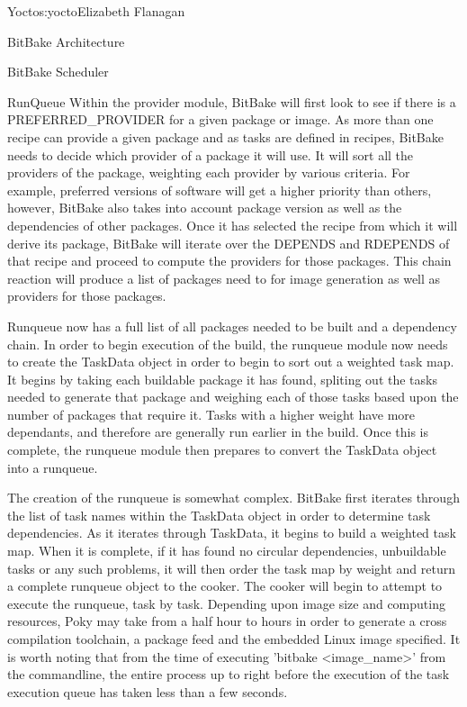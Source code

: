 \begin{aosachapter}{Yocto}{s:yocto}{Elizabeth Flanagan}
\begin{aosasect1}{BitBake Architecture}
\begin{aosasect2}{BitBake Scheduler}
\begin{aosasect3}{RunQueue}
Within the provider module, BitBake will first look to see if there is
a PREFERRED\_PROVIDER for a given package or image. As more than one
recipe can provide a given package and as tasks are defined in
recipes, BitBake needs to decide which provider of a package it will
use. It will sort all the providers of the package, weighting each
provider by various criteria. For example, preferred versions of
software will get a higher priority than others, however, BitBake also
takes into account package version as well as the dependencies of
other packages. Once it has selected the recipe from which it will
derive its package, BitBake will iterate over the DEPENDS and RDEPENDS
of that recipe and proceed to compute the providers for those
packages. This chain reaction will produce a list of packages need to
for image generation as well as providers for those packages.

Runqueue now has a full list of all packages needed to be built and a
dependency chain. In order to begin execution of the build, the
runqueue module now needs to create the TaskData object in order to
begin to sort out a weighted task map. It begins by taking each
buildable package it has found, spliting out the tasks needed to
generate that package and weighing each of those tasks based upon the
number of packages that require it. Tasks with a higher weight have
more dependants, and therefore are generally run earlier in the
build. Once this is complete, the runqueue module then prepares to
convert the TaskData object into a runqueue.

The creation of the runqueue is somewhat complex. BitBake first
iterates through the list of task names within the TaskData object in
order to determine task dependencies. As it iterates through TaskData,
it begins to build a weighted task map. When it is complete, if it has
found no circular dependencies, unbuildable tasks or any such
problems, it will then order the task map by weight and return a
complete runqueue object to the cooker. The cooker will begin to
attempt to execute the runqueue, task by task. Depending upon image
size and computing resources, Poky may take from a half hour to hours
in order to generate a cross compilation toolchain, a package feed and
the embedded Linux image specified. It is worth noting that from the
time of executing 'bitbake
{\textless}image\_name{\textgreater}' from the commandline,
the entire process up to right before the execution of the task
execution queue has taken less than a few seconds.

\end{aosasect3}


\end{aosasect2}
\end{aosasect1}
\end{aosachapter}
